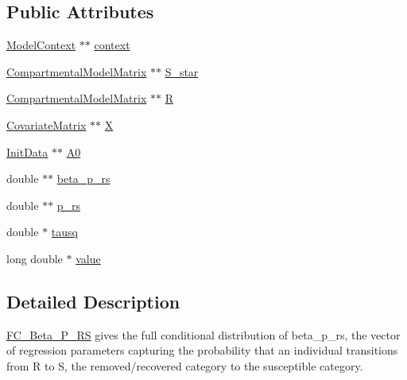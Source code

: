\subsection*{Public Attributes}
\begin{DoxyCompactItemize}
\item 
\hyperlink{classSpatialSEIR_1_1ModelContext}{Model\-Context} $\ast$$\ast$ \hyperlink{classSpatialSEIR_1_1FC__Beta__P__RS_a5a34e90887bdaaf95426dd6aeffae6d5}{context}
\item 
\hyperlink{classSpatialSEIR_1_1CompartmentalModelMatrix}{Compartmental\-Model\-Matrix} $\ast$$\ast$ \hyperlink{classSpatialSEIR_1_1FC__Beta__P__RS_a4dea39caba374bb0ed9c1aa8d49c61cb}{S\-\_\-star}
\item 
\hyperlink{classSpatialSEIR_1_1CompartmentalModelMatrix}{Compartmental\-Model\-Matrix} $\ast$$\ast$ \hyperlink{classSpatialSEIR_1_1FC__Beta__P__RS_ad559b562d62e49e84fd737b001c887ef}{R}
\item 
\hyperlink{classSpatialSEIR_1_1CovariateMatrix}{Covariate\-Matrix} $\ast$$\ast$ \hyperlink{classSpatialSEIR_1_1FC__Beta__P__RS_a72f85c7949041f789c8a33cfd2e4f852}{X}
\item 
\hyperlink{classSpatialSEIR_1_1InitData}{Init\-Data} $\ast$$\ast$ \hyperlink{classSpatialSEIR_1_1FC__Beta__P__RS_a5ea17a82e1f860711f90db551b6412d8}{A0}
\item 
double $\ast$$\ast$ \hyperlink{classSpatialSEIR_1_1FC__Beta__P__RS_a57051ca845486c65fe38c42a55e3da5d}{beta\-\_\-p\-\_\-rs}
\item 
double $\ast$$\ast$ \hyperlink{classSpatialSEIR_1_1FC__Beta__P__RS_a69c39eb32b77b000c23e88259d01e913}{p\-\_\-rs}
\item 
double $\ast$ \hyperlink{classSpatialSEIR_1_1FC__Beta__P__RS_abbe3f96f9301c22e015cf7d16043b34c}{tausq}
\item 
long double $\ast$ \hyperlink{classSpatialSEIR_1_1FC__Beta__P__RS_af0841ebe767c583894eec3c3f4bcd3e9}{value}
\end{DoxyCompactItemize}


\subsection{Detailed Description}
\hyperlink{classSpatialSEIR_1_1FC__Beta__P__RS}{F\-C\-\_\-\-Beta\-\_\-\-P\-\_\-\-R\-S} gives the full conditional distribution of beta\-\_\-p\-\_\-rs, the vector of regression parameters capturing the probability that an individual transitions from R to S, the removed/recovered category to the susceptible category. 

